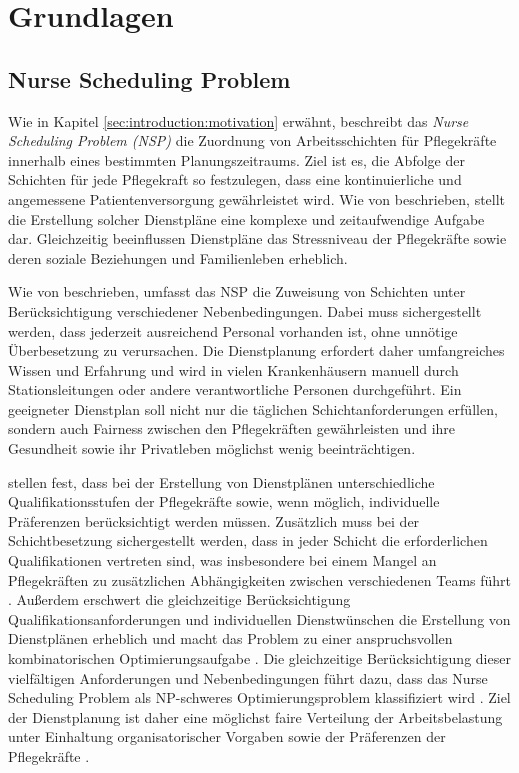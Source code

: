 
\chapter{Grundlagen}
\label{sec:grundlagen}

\section{Nurse Scheduling Problem}
Wie in Kapitel \ref{sec:introduction:motivation} erwähnt, beschreibt das \textit{Nurse Scheduling Problem (NSP)} die Zuordnung von Arbeitsschichten für Pflegekräfte innerhalb eines bestimmten Planungszeitraums. Ziel ist es, die Abfolge der Schichten für jede Pflegekraft so festzulegen, dass eine kontinuierliche und angemessene Patientenversorgung gewährleistet wird. Wie von \textcite{Oughalime2008} beschrieben, stellt die Erstellung solcher Dienstpläne eine komplexe und zeitaufwendige Aufgabe dar. Gleichzeitig beeinflussen Dienstpläne das Stressniveau der Pflegekräfte sowie deren soziale Beziehungen und Familienleben erheblich.

Wie von \textcite{Oughalime2008} beschrieben, umfasst das NSP die Zuweisung von Schichten unter Berücksichtigung verschiedener Nebenbedingungen. Dabei muss sichergestellt werden, dass jederzeit ausreichend Personal vorhanden ist, ohne unnötige Überbesetzung zu verursachen. Die Dienstplanung erfordert daher umfangreiches Wissen und Erfahrung und wird in vielen Krankenhäusern manuell durch Stationsleitungen oder andere verantwortliche Personen durchgeführt. Ein geeigneter Dienstplan soll nicht nur die täglichen Schichtanforderungen erfüllen, sondern auch Fairness zwischen den Pflegekräften gewährleisten und ihre Gesundheit sowie ihr Privatleben möglichst wenig beeinträchtigen.

\textcite{ayoughiDragonflyAlgorithmApplication2024} stellen fest, dass bei der Erstellung von Dienstplänen unterschiedliche Qualifikationsstufen der Pflegekräfte sowie, wenn möglich, individuelle Präferenzen berücksichtigt werden müssen. Zusätzlich muss bei der Schichtbesetzung sichergestellt werden, dass in jeder Schicht die erforderlichen Qualifikationen vertreten sind, was insbesondere bei einem Mangel an Pflegekräften zu zusätzlichen Abhängigkeiten zwischen verschiedenen Teams führt \parencite{ikegamiSubproblemcentricModelApproach2003}. Außerdem erschwert die gleichzeitige Berücksichtigung Qualifikationsanforderungen und individuellen Dienstwünschen die Erstellung von Dienstplänen erheblich und macht das Problem zu einer anspruchsvollen kombinatorischen Optimierungsaufgabe \parencite{ikegamiSubproblemcentricModelApproach2003}. Die gleichzeitige Berücksichtigung dieser vielfältigen Anforderungen und Nebenbedingungen führt dazu, dass das Nurse Scheduling Problem als NP-schweres Optimierungsproblem klassifiziert wird \parencite{ayoughiDragonflyAlgorithmApplication2024}. Ziel der Dienstplanung ist daher eine möglichst faire Verteilung der Arbeitsbelastung unter Einhaltung organisatorischer Vorgaben sowie der Präferenzen der Pflegekräfte \parencite{ayoughiDragonflyAlgorithmApplication2024}.

